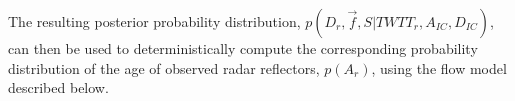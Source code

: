 The resulting posterior probability distribution, $p(D_r, \vec{f},S | TWTT_r, A_{IC}, D_{IC})$, can then be used to deterministically compute the corresponding probability distribution of the age of observed radar reflectors, $p(A_r)$, using the flow model described below.



\label{radardepth}

%



